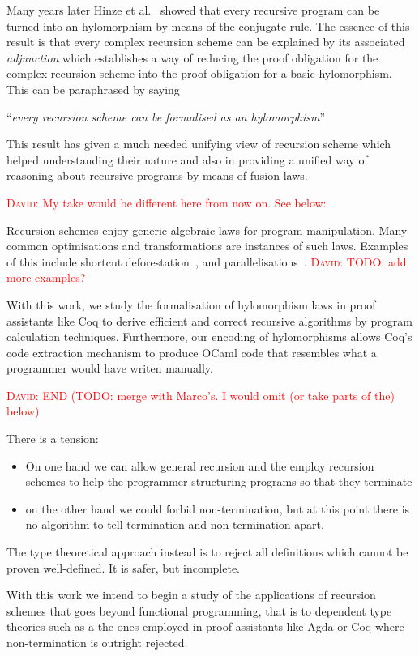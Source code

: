 \documentclass{article}
\newcommand{\dcas}[1]{\textcolor{red}{\textsc{David}: #1}}
\begin{document}
Many years later Hinze et al.~\cite{HinzeWG15} showed that every recursive
program can be turned into an hylomorphism by means of the conjugate rule. The
essence of this result is that every complex recursion scheme can be explained
by its associated \emph{adjunction} which establishes a way of reducing the
proof obligation for the complex recursion scheme into the proof obligation for
a basic hylomorphism. This can be paraphrased by saying
\begin{center}
  ``\emph{every recursion scheme can be formalised as an hylomorphism}''
\end{center}

This result has given a much needed unifying view of recursion scheme which
helped understanding their nature and also in providing a unified way of
reasoning about recursive programs by means of fusion laws.

\dcas{My take would be different here from now on. See below:}

Recursion schemes enjoy generic algebraic laws for program manipulation. Many
common optimisations and transformations are instances of such laws. Examples
of this include shortcut deforestation~\cite{TakanoM95}, and
parallelisations~\cite{Gibbons96:Third}. \dcas{TODO: add more examples?}

With this work, we study the formalisation of hylomorphism laws in proof
assistants like Coq to derive efficient and correct recursive algorithms by
program calculation techniques. Furthermore, our encoding of hylomorphisms
allows Coq's code extraction mechanism to produce OCaml code that resembles
what a programmer would have writen manually.

\dcas{END (TODO: merge with Marco's. I would omit (or take parts of the) below)}


There is a tension:
\begin{itemize}
  \item On one hand we can allow general recursion and the employ recursion
schemes to help the programmer structuring programs so that they terminate
  \item on the other hand we could forbid non-termination, but at this point
there is no algorithm to tell termination and non-termination apart.
\end{itemize}

The type theoretical approach instead is to reject all definitions which cannot
be proven well-defined. It is safer, but incomplete.


With this work we intend to begin a study of the applications of recursion
schemes that goes beyond functional programming, that is to dependent type
theories such as a the ones employed in proof assistants like Agda or Coq where
non-termination is outright rejected.
\end{document}
